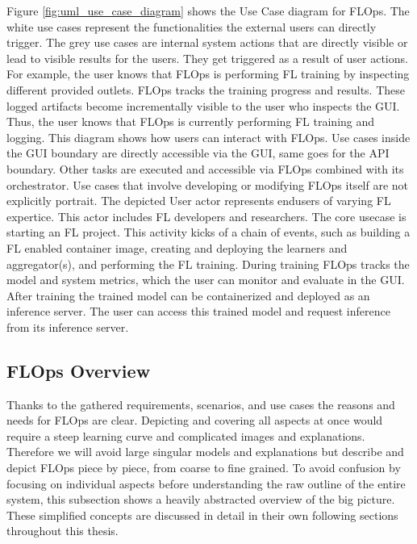 Figure \ref{fig:uml_use_case_diagram} shows the Use Case diagram for FLOps.
The white use cases represent the functionalities the external users can directly trigger.
The grey use cases are internal system actions that are directly visible or lead to visible results for the users.
They get triggered as a result of user actions.
For example, the user knows that FLOps is performing FL training by inspecting different provided outlets.
FLOps tracks the training progress and results.
These logged artifacts become incrementally visible to the user who inspects the GUI.
Thus, the user knows that FLOps is currently performing FL training and logging.
This diagram shows how users can interact with FLOps.
Use cases inside the GUI boundary are directly accessible via the GUI, same goes for the API boundary.
Other tasks are executed and accessible via FLOps combined with its orchestrator.
Use cases that involve developing or modifying FLOps itself are not explicitly portrait.
The depicted User actor represents endusers of varying FL expertice.
This actor includes FL developers and researchers.
The core usecase is starting an FL project.
This activity kicks of a chain of events, such as building a FL enabled container image, creating and deploying the learners and aggregator(s), and performing the FL training.
During training FLOps tracks the model and system metrics, which the user can monitor and evaluate in the GUI.
After training the trained model can be containerized and deployed as an inference server.
The user can access this trained model and request inference from its inference server.



\subsection{FLOps Overview}

Thanks to the gathered requirements, scenarios, and use cases the reasons and needs for FLOps are clear.
Depicting and covering all aspects at once would require a steep learning curve and complicated images and explanations.
Therefore we will avoid large singular models and explanations but describe and depict FLOps piece by piece, from coarse to fine grained.
To avoid confusion by focusing on individual aspects before understanding the raw outline of the entire system,
this subsection shows a heavily abstracted overview of the big picture.
These simplified concepts are discussed in detail in their own following sections throughout this thesis.

